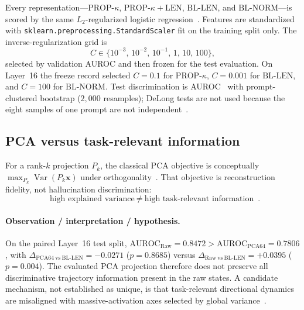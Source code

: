 \documentclass{article}
\newcommand{\auroc}{\mathrm{AUROC}}
\newcommand{\propk}{\mathrm{PROP}\text{-}\kappa}
\newcommand{\bllen}{\mathrm{BL\text{-}LEN}}
\newcommand{\blnorm}{\mathrm{BL\text{-}NORM}}
\begin{document}
Every representation---$\propk$, $\propk+\mathrm{LEN}$, $\bllen$, and $\blnorm$---is scored by the same $L_2$-regularized logistic regression~\citep{exptrj001plan}.
Features are standardized with \texttt{sklearn.preprocessing.StandardScaler} fit on the training split only.
The inverse-regularization grid is
\begin{equation}
  C \in \{10^{-3},\,10^{-2},\,10^{-1},\,1,\,10,\,100\},
\end{equation}
selected by validation {AUROC} and then frozen for the test evaluation.
On Layer~16 the freeze record selected $C=0.1$ for $\propk$, $C=0.001$ for $\bllen$, and $C=100$ for $\blnorm$.
Test discrimination is {AUROC}~\citep{hanley1982,fawcett2006} with prompt-clustered bootstrap ($2{,}000$ resamples); {DeLong} tests are not used because the eight samples of one prompt are not independent~\citep{efron1993}.

\subsection{{PCA} versus task-relevant information}
\label{sec:bg-pca}

For a rank-$k$ projection $P_k$, the classical {PCA} objective is conceptually $\max_{P_k}\operatorname{Var}(P_k\mathbf{x})$ under orthogonality~\citep{pearson1901,jolliffe2002}.
That objective is reconstruction fidelity, not hallucination discrimination:
\begin{equation}
\boxed{\
  \text{high explained variance}
  \ \neq\
  \text{high task-relevant information}
\ }.
\label{eq:var-neq-signal}
\end{equation}

\paragraph{Observation / interpretation / hypothesis.}
On the paired Layer~16 test split,
$\auroc_{\mathrm{Raw}}=0.8472>\auroc_{\mathrm{PCA64}}=0.7806$,
with $\Delta_{\mathrm{PCA64\ vs\ }\bllen}=-0.0271$ ($p=0.8685$) versus
$\Delta_{\mathrm{Raw\ vs\ }\bllen}=+0.0395$ ($p=0.004$).
The evaluated {PCA} projection therefore does not preserve all discriminative trajectory information present in the raw states.
A candidate mechanism, not established as unique, is that task-relevant directional dynamics are misaligned with massive-activation axes selected by global variance~\citep{sun2024massive,park2024linear,elhage2022toy}.

\end{document}
